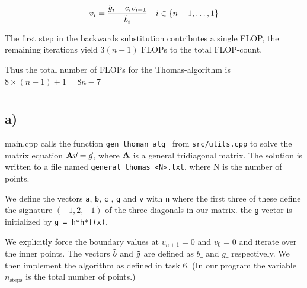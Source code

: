 \documentclass[a4paper,10pt,english]{article}
\begin{document}
			\begin{equation}
				v_i = \frac{\Tilde{g}_i - c_iv_{i+1}}{\Tilde{b}_i} \quad i \in \{n-1, \dots, 1\}
				\label{eq_gen_algo_V}
			\end{equation}
			
			The first step in the backwards substitution contributes a single FLOP, the
			remaining iterations yield $3(n-1)$ FLOPs to the total FLOP-count.
			
			Thus the total number of FLOPs for the Thomas-algorithm is $8 \times (n-1) + 1 = 8n - 7$
			
			\section{} %
			\subsection{a)}
			main.cpp calls the function  \verb|gen_thoman_alg | from \verb|src/utils.cpp| to solve the
			matrix equation $\bold{A}\vec{v} = \vec{g}$, where $\bold{A}$ is a general tridiagonal matrix.
			The solution is written to a file named \verb|general_thomas_<N>.txt|, where N is the number of points.
			
			We define the vectors \verb|a|, \verb|b|, \verb|c| , \verb|g| and \verb|v| with \verb|n| where the first three of these define the signature $(-1, 2, -1)$ of the three diagonals in our matrix. the \verb|g|-vector is initialized by \verb|g = h*h*f(x)|.
			
			We explicitly force the boundary values at $v_{n + 1} = 0$ 
			and $v_0 = 0$ and iterate over the inner points. The vectors 
			$\Tilde{b}$ and $\Tilde{g}$ are defined as 
			$b\_$ and $g\_$ respectively. 
			We then implement the algorithm as defined in task 6. (In our program
			the variable $n_{\text{steps}}$ is the total number of points.)
			
\end{document}
